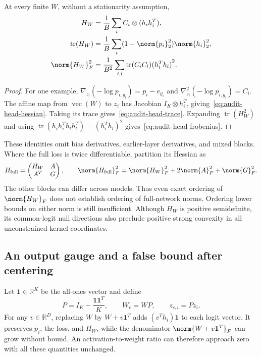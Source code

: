 \begin{lemma}%
\label{lemma:audit-head-hessian}
At every finite $W$, without a stationarity assumption,
\begin{align}
    H_W&=\frac{1}{B}\sum_i C_i\otimes(h_i h_i^T),
    \label{eq:audit-head-hessian}\\
    \operatorname{tr}(H_W)&=\frac{1}{B}\sum_i(1-\norm{p_i}_2^2)\norm{h_i}_2^2,
    \label{eq:audit-head-trace}\\
    \norm{H_W}_F^2&=\frac{1}{B^2}\sum_{i,l}\operatorname{tr}(C_i C_l){(h_i^T h_l)}^2.
    \label{eq:audit-head-frobenius}
\end{align}
\end{lemma}
\begin{proof}
For one example, $\nabla_{z_i}(-\log p_{i,y_i})=p_i-e_{y_i}$ and $\nabla^2_{z_i}(-\log p_{i,y_i})=C_i$. The affine map from $\operatorname{vec}(W)$ to $z_i$ has Jacobian $I_K\otimes h_i^T$, giving~\eqref{eq:audit-head-hessian}. Taking its trace gives~\eqref{eq:audit-head-trace}. Expanding $\operatorname{tr}(H_W^2)$ and using $\operatorname{tr}(h_i h_i^T h_l h_l^T)={(h_i^T h_l)}^2$ gives~\eqref{eq:audit-head-frobenius}.
\end{proof}

These identities omit bias derivatives, earlier-layer derivatives, and mixed blocks. Where the full loss is twice differentiable, partition its Hessian as
\begin{equation}
    H_{\mathrm{full}}=
    \begin{pmatrix}H_W&A\\A^T&G\end{pmatrix},\qquad
    \norm{H_{\mathrm{full}}}_F^2=\norm{H_W}_F^2+2\norm{A}_F^2+\norm{G}_F^2.
\end{equation}
The other blocks can differ across models. Thus even exact ordering of $\norm{H_W}_F$ does not establish ordering of full-network norms. Ordering lower bounds on either norm is still insufficient. Although $H_W$ is positive semidefinite, its common-logit null directions also preclude positive strong convexity in all unconstrained kernel coordinates.

\subsection{An output gauge and a false bound after centering}

Let $\mathbf{1}\in\mathbb{R}^K$ be the all-ones vector and define
\begin{equation}
    P=I_K-\frac{\mathbf{1}\mathbf{1}^T}{K},\qquad W_c=WP,\qquad z_{c,i}=Pz_i.
\end{equation}
For any $v\in\mathbb{R}^D$, replacing $W$ by $W+v\mathbf{1}^T$ adds $(v^T h_i)\mathbf{1}$ to each logit vector. It preserves $p_i$, the loss, and $H_W$, while the denominator $\norm{W+v\mathbf{1}^T}_F$ can grow without bound. An activation-to-weight ratio can therefore approach zero with all these quantities unchanged.

